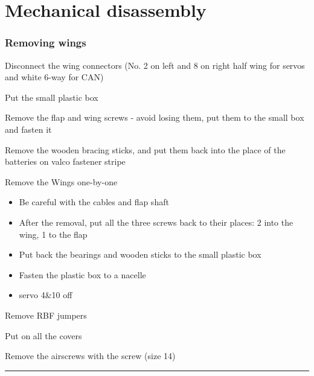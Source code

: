 	\section{Mechanical disassembly}\label{iv.-mechanical-disassembly}
	
	\subsubsection*{Removing wings}
	
	\begin{todolist}
	\itemsep1pt\parskip0pt
	\item
	  Disconnect the wing connectors (No. 2 on left and 8 on right half wing
	  for servos and white 6-way for CAN)
	\item
	  Put the small plastic box
	\item
	  Remove the flap and wing screws - avoid losing them, put them to the
	  small box and fasten it
	\item
	  Remove the wooden bracing sticks, and put them back into the place of
	  the batteries on valco fastener stripe
	\item
	  Remove the Wings one-by-one
	
	  \begin{itemize}
	  \itemsep1pt\parskip0pt
	  \item
	    Be careful with the cables and flap shaft
	  \item
	    After the removal, put all the three screws back to their places: 2
	    into the wing, 1 to the flap
	  \item
	    Put back the bearings and wooden sticks to the small plastic box
	  \item
	    Fasten the plastic box to a nacelle
	  \item
	    servo 4\&10 off
	  \end{itemize}
	\item
	  Remove RBF jumpers
	\item
	  Put on all the covers
	\item
	  Remove the airscrews with the screw (size 14)
	\end{todolist}
	
	\begin{center}\rule{3in}{0.4pt}\end{center}
	
